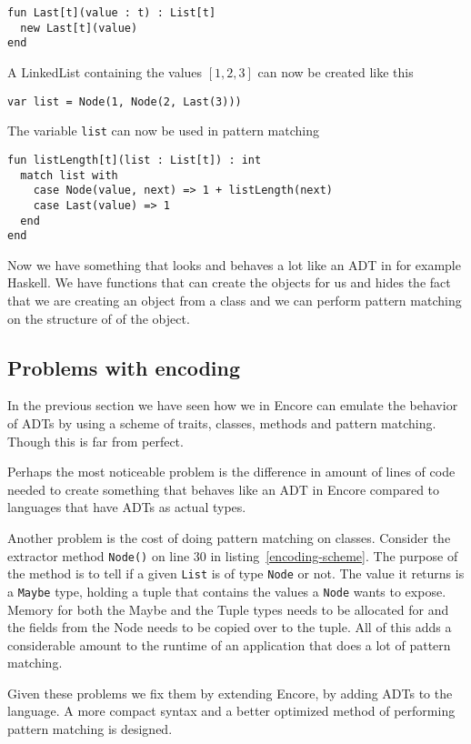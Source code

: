 \documentclass[10pt]{report}
\def\code#1{\texttt{#1}} %
\begin{document}
{\begin{lstlisting}[language=encore,caption={Constructor functions for Node and Last}]
fun Last[t](value : t) : List[t]
  new Last[t](value)
end
\end{lstlisting}

\par{A LinkedList containing the values $[1, 2, 3]$ can now be created like this}
\begin{lstlisting}[language=encore,caption={Creation of list containing three elements}]
var list = Node(1, Node(2, Last(3)))
\end{lstlisting}

\par{The variable \code{list} can now be used in pattern matching}

\begin{lstlisting}[language=encore,caption={Function that uses pattern matching to calculate the length of a list}]
fun listLength[t](list : List[t]) : int
  match list with
    case Node(value, next) => 1 + listLength(next)
    case Last(value) => 1
  end
end
\end{lstlisting}

\par{Now we have something that looks and behaves a lot like an ADT in for example Haskell. We have functions that can create the objects for us and hides the fact that we are creating an object from a class and we can perform pattern matching on the structure of of the object.}

\subsection{Problems with encoding} \label{problems}
\par{In the previous section we have seen how we in Encore can emulate the behavior of ADTs by using a scheme of traits, classes, methods and pattern matching. Though this is far from perfect.}
\par{Perhaps the most noticeable problem is the difference in amount of lines of code needed to create something that behaves like an ADT in Encore compared to languages that have ADTs as actual types.}
\par{Another problem is the cost of doing pattern matching on classes. Consider the extractor method \code{Node()} on line 30 in listing~\ref{encoding-scheme}. The purpose of the method is to tell if a given \code{List} is of type \code{Node} or not. The value it returns is a \code{Maybe} type, holding a tuple that contains the values a \code{Node} wants to expose. Memory for both the Maybe and the Tuple types needs to be allocated for and the fields from the Node needs to be copied over to the tuple. All of this adds a considerable amount to the runtime of an application that does a lot of pattern matching.}
\par{Given these problems we fix them by extending Encore, by adding ADTs to the language. A more compact syntax and a better optimized method of performing pattern matching is designed.}
}
\end{document}
